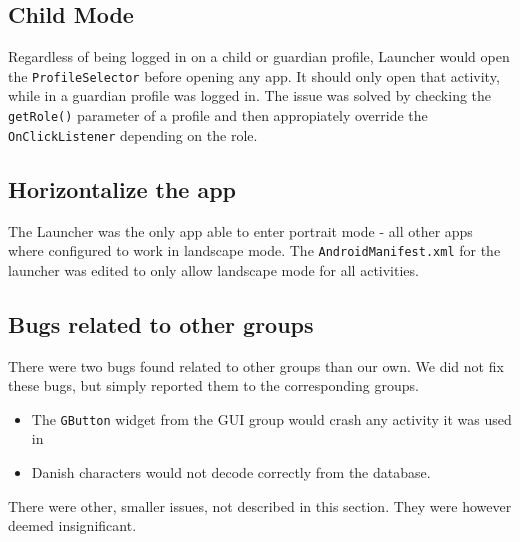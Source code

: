 \subsection*{Child Mode}

Regardless of being logged in on a child or guardian profile, Launcher would open the \lstinline{ProfileSelector} before opening any app.
It should only open that activity, while in a guardian profile was logged in.
The issue was solved by checking the \lstinline{getRole()} parameter of a profile and then appropiately override the \lstinline{OnClickListener} depending on the role. 

\subsection*{Horizontalize the app}

The Launcher was the only app able to enter portrait mode - all other apps where configured to work in landscape mode.
The \lstinline{AndroidManifest.xml} for the launcher was edited to only allow landscape mode for all activities.

\subsection*{Bugs related to other groups}

There were two bugs found related to other groups than our own.
We did not fix these bugs, but simply reported them to the corresponding groups.

\begin{itemize}
\item The \lstinline{GButton} widget from the GUI group would crash any activity it was used in
\item Danish characters would not decode correctly from the database.
\end{itemize}

There were other, smaller issues, not described in this section.
They were however deemed insignificant.